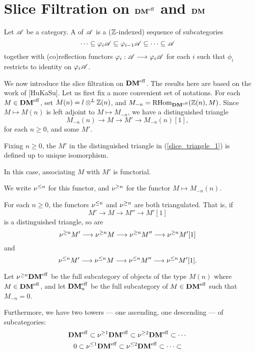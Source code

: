 \newpage
\section{Slice Filtration on $\mathbf{DM}^{\mathrm{eff}}$ and $\mathbf{DM}$}\label{sect_slice_filt_dm}

\begin{defn}\label{def_cat_filtration}
Let $\mathscr{A}$ be a category. A  of $\mathscr{A}$ 
is a ($\mathbb{Z}$-indexed) sequence of subcategories
\[
\cdots \subseteq \varphi_i\mathscr{A} \subseteq \varphi_{i - 1}\mathscr{A} 
   \subseteq \cdots \subseteq \mathscr{A}
\]
together with (co)reflection functors $\varphi_i: \mathscr{A} \longrightarrow 
\varphi_i\mathscr{A}$ for each $i$ such that $\phi_i$ restricts to 
identity on $\varphi_i\mathscr{A}$.
\end{defn}

We now introduce the slice filtration on $\mathbf{DM}^{\mathrm{eff}}$. The results here
are based on the work of [HuKaSu]. Let us first fix a more 
convenient set of notations. For each $M \in \mathbf{DM}^{\mathrm{eff}}$, set $M(n) = 
l \otimes^L \mathbb{Z}(n)$, and $M_{-n} = \mathrm{RHom}_{\mathbf{DM}^{\mathrm{eff}}}(\mathbb{Z}(n), M)$. Since $M \mapsto
M(n)$ is left adjoint to $M \mapsto M_{-n}$, we have a 
distinguished triangle 
\begin{equation}\label{slice_triangle_1}
M_{-n}(n) \to M \to M' \to M_{-n}(n)[1],
\end{equation}
for each $n \geq 0$, and some $M'$. 

\begin{prop}
Fixing $n \geq 0$, the $M'$ in the distinguished triangle in
(\ref{slice_triangle_1}) is defined up to unique isomorphism.

In this case, associating $M$ with $M'$ is functorial.
\end{prop}

We write $\nu^{\leq n}$ for this functor, and $\nu^{\geq n}$ for the
functor $M \mapsto M_{-n}(n)$.

\begin{prop}
For each $n \geq 0$, the functors $\nu^{\leq n}$ and $\nu^{\geq n}$ are
both triangulated. That is, if
\[
M' \to M \to M'' \to M'[1]
\]
is a distinguished triangle, so are
\[
\nu^{\geq n}M' \longrightarrow \nu^{\geq n}M \longrightarrow \nu^{\geq n}M'' \longrightarrow \nu^{\geq n}M'[1]
\]
and
\[
\nu^{\leq n}M' \longrightarrow \nu^{\leq n}M \longrightarrow \nu^{\leq n}M'' \longrightarrow \nu^{\leq n}M'[1].
\]
\end{prop}

Let $\nu^{\geq n}\mathbf{DM}^{\mathrm{eff}}$ be the full subcategory of objects of the 
type $M(n)$ where $M \in \mathbf{DM}^{\mathrm{eff}}$, and let $\mathbf{DM}^{\mathrm{eff}}_{n}$ be the full 
subcategory of $M \in \mathbf{DM}^{\mathrm{eff}}$ such that $M_{-n} = 0$.

Furthermore, we have two towers --- one ascending, one descending 
--- of subcategories:
\begin{equation}
\mathbf{DM}^{\mathrm{eff}} \subset \nu^{\geq 1}\mathbf{DM}^{\mathrm{eff}} \subset \nu^{\geq 2}\mathbf{DM}^{\mathrm{eff}} \subset \cdots \\
\end{equation}
\vskip 5pt
\begin{equation}
0 \subset \nu^{\leq 1}\mathbf{DM}^{\mathrm{eff}} \subset \nu^{\leq 2}\mathbf{DM}^{\mathrm{eff}} \subset \cdots \subset
\end{equation}

